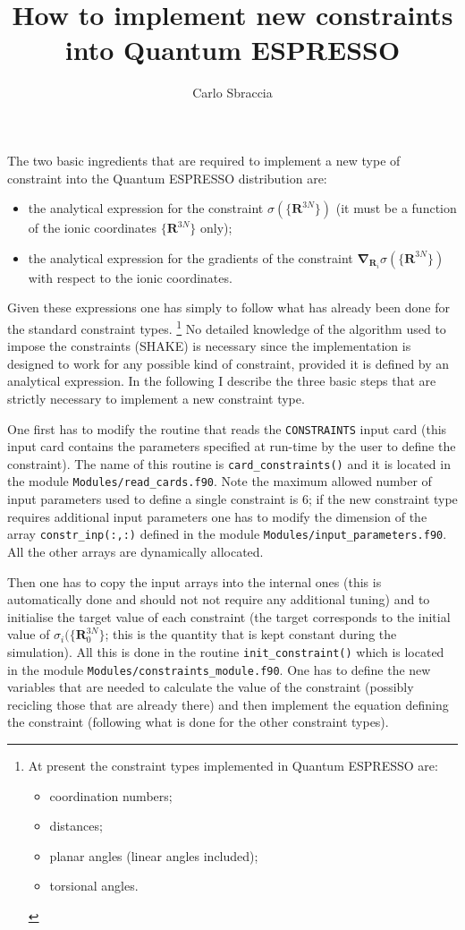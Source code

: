 \documentclass[a4paper,12pt,notitlepage]{report}
\author{Carlo Sbraccia}
\newcommand{\Rb}{\mathbf R}
\newcommand{\nb}{\boldsymbol \nabla}
\begin{document}
\title{How to implement new constraints into Quantum ESPRESSO}
%
\maketitle

The two basic ingredients that are required to implement a new type of
constraint into the Quantum ESPRESSO distribution are:
%
\begin{itemize}
\item the analytical expression for the constraint $\sigma(\{\Rb^{3N}\})$ (it
must be a function of the ionic coordinates $\{\Rb^{3N}\}$ only);
\item the analytical expression for the gradients of the constraint
$\nb_{\Rb_i}\sigma(\{\Rb^{3N}\})$ with respect to the ionic coordinates.
\end{itemize}
%
Given these expressions one has simply to follow what has already been done for
the standard constraint types.%
%
\footnote{At present the constraint types implemented in Quantum ESPRESSO are:
\begin{itemize}
\item coordination numbers;
\item distances;
\item planar angles (linear angles included);
\item torsional angles.
\end{itemize}}
%
No detailed knowledge of the algorithm used to impose the constraints (SHAKE) is
necessary since the implementation is designed to work for any possible kind of
constraint, provided it is defined by an analytical expression. In the
following I describe the three basic steps that are strictly necessary to
implement a new constraint type.

One first has to modify the routine that reads the \texttt{CONSTRAINTS}
input card (this input card contains the parameters specified at run-time by the
user to define the constraint). The name of this routine is
\texttt{card\_constraints()} and it is located in the module
\texttt{Modules/read\_cards.f90}. Note the maximum allowed number of input
parameters used to define a single constraint is 6; if the new constraint type
requires additional input parameters one has to modify the dimension of the
array \texttt{constr\_inp(:,:)} defined in the module
\texttt{Modules/input\_parameters.f90}. All the other arrays are dynamically
allocated.

Then one has to copy the input arrays into the internal ones (this is
automatically done and should not not require any additional tuning) and to
initialise the target value of each constraint (the target corresponds to the
initial value of $\sigma_i(\{\Rb^{3N}_0\}$; this is the quantity that is kept
constant during the simulation).
All this is done in the routine \texttt{init\_constraint()} which is
located in the module \texttt{Modules/constraints\_module.f90}. One has to
define the new variables that are needed to calculate the value of the
constraint (possibly recicling those that are already there) and then implement
the equation defining the constraint (following what is done for the other
constraint types).
\end{document}
